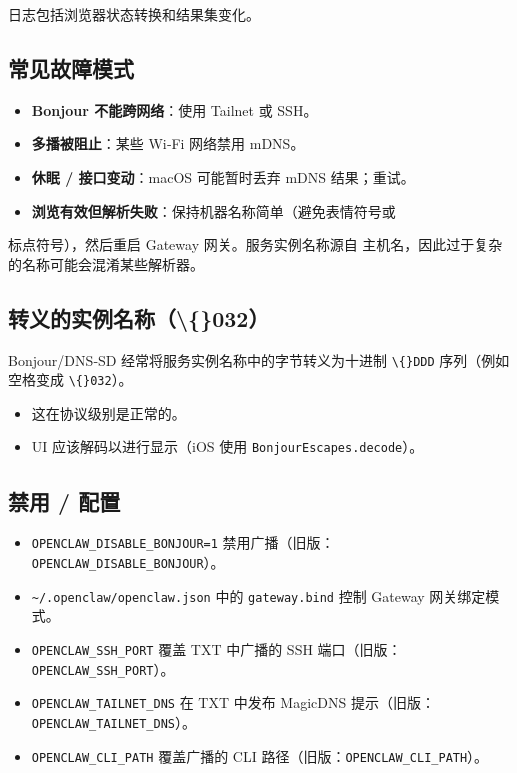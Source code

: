 日志包括浏览器状态转换和结果集变化。

\subsection{常见故障模式}


\begin{itemize}
  \item \textbf{Bonjour 不能跨网络}：使用 Tailnet 或 SSH。
  \item \textbf{多播被阻止}：某些 Wi‑Fi 网络禁用 mDNS。
  \item \textbf{休眠 / 接口变动}：macOS 可能暂时丢弃 mDNS 结果；重试。
  \item \textbf{浏览有效但解析失败}：保持机器名称简单（避免表情符号或
\end{itemize}

标点符号），然后重启 Gateway 网关。服务实例名称源自
主机名，因此过于复杂的名称可能会混淆某些解析器。

\subsection{转义的实例名称（\textbackslash\{\}032）}


Bonjour/DNS‑SD 经常将服务实例名称中的字节转义为十进制 \texttt{\textbackslash\{\}DDD}
序列（例如空格变成 \texttt{\textbackslash\{\}032}）。

\begin{itemize}
  \item 这在协议级别是正常的。
  \item UI 应该解码以进行显示（iOS 使用 \texttt{BonjourEscapes.decode}）。
\end{itemize}


\subsection{禁用 / 配置}


\begin{itemize}
  \item \texttt{OPENCLAW\_DISABLE\_BONJOUR=1} 禁用广播（旧版：\texttt{OPENCLAW\_DISABLE\_BONJOUR}）。
  \item \texttt{\textasciitilde{}/.openclaw/openclaw.json} 中的 \texttt{gateway.bind} 控制 Gateway 网关绑定模式。
  \item \texttt{OPENCLAW\_SSH\_PORT} 覆盖 TXT 中广播的 SSH 端口（旧版：\texttt{OPENCLAW\_SSH\_PORT}）。
  \item \texttt{OPENCLAW\_TAILNET\_DNS} 在 TXT 中发布 MagicDNS 提示（旧版：\texttt{OPENCLAW\_TAILNET\_DNS}）。
  \item \texttt{OPENCLAW\_CLI\_PATH} 覆盖广播的 CLI 路径（旧版：\texttt{OPENCLAW\_CLI\_PATH}）。
\end{itemize}


